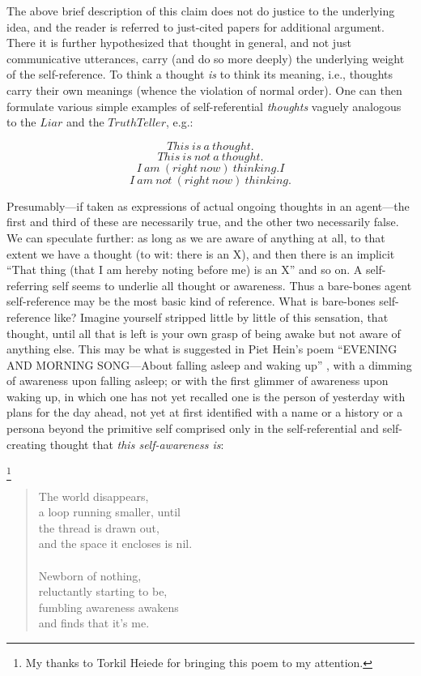 \documentclass{amsart}
\begin{document}
The above brief description of this claim does not do justice to the
underlying idea, and the reader is referred to just-cited papers for
additional argument. There it is further hypothesized that
thought in general, and not just communicative utterances, carry (and
do so more deeply) the underlying weight of the self-reference. 
To think a thought {\em is} to think its meaning, i.e., thoughts
carry their own meanings (whence the violation of normal order).  One
can then formulate various simple examples of self-referential {\em
thoughts} vaguely analogous to the $Liar$ and the $TruthTeller$, e.g.:

$$This~ is~ a~ thought.$$
$$This~ is~ not~ a~ thought.$$
$$I~ am~ (right~ now)~ thinking.I$$
$$I~ am~ not~ (right~ now)~ thinking.$$

Presumably---if taken as expressions of actual ongoing thoughts in
an agent---the first and third of these are necessarily true, and the
other two necessarily false.  
We can speculate further: as long as we are aware of anything at all,
to that extent we have a thought (to wit: there is an X), and then
there is an implicit ``That thing (that I am hereby noting before me) is an
X'' and so on. A self-referring self seems to underlie all thought or
awareness.  Thus a bare-bones agent self-reference may be the most basic
kind of reference.  What is bare-bones self-reference like? Imagine
yourself stripped little by little of this sensation, that thought,
until all that is left is your own grasp of being awake but not aware
of anything else.  This may be what is suggested in Piet Hein's poem
``EVENING AND MORNING SONG---About falling asleep and waking up''
\cite{hein:grooks}, with a dimming of awareness upon falling asleep;
or with the first glimmer of awareness upon waking up, in which one has
not yet recalled one is the person of yesterday with plans for
the day ahead, not yet at first identified with a name or a history or
a persona beyond the primitive self comprised only in the
self-referential and self-creating thought
that {\em this self-awareness is}:

\footnote{
My thanks to Torkil Heiede for bringing this poem to my attention.
}


\begin{quote}
The world disappears,\\
a loop running smaller, until\\
the thread is drawn out,\\
and the space it encloses is nil.\\ \\
\noindent
Newborn of nothing,\\
reluctantly starting to be,\\
fumbling awareness awakens\\
and finds that it's me.
\end{quote}
\end{document}
